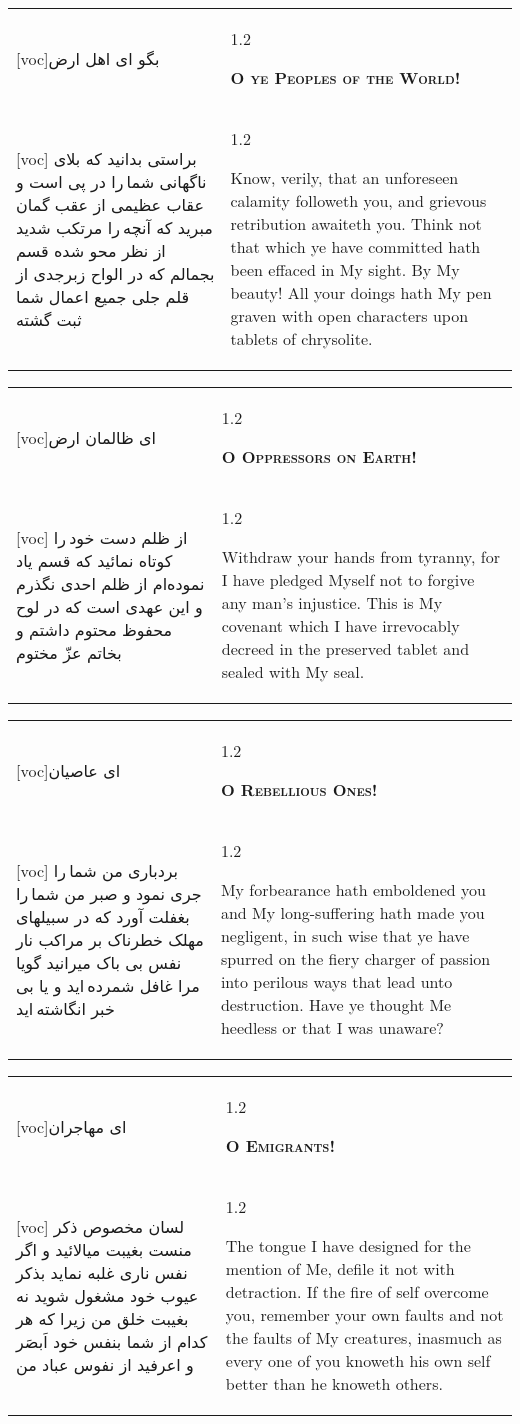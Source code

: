 \documentclass[11pt]{article}
\makeatletter
\newenvironment{orig}
  {\begin{farsi}[voc]}
  {\end{farsi}}
\newenvironment{trans}
  {\Large\begin{spacing}{1.2}\raggedright}
  {\end{spacing}}
\newenvironment{word}
  {\begin{tabular}[t]{p{2.75in}@{\hspace{3em}}p{2.75in}}}
  {\end{tabular}}
\newcommand{\ayat}[2]{\begin{orig}#1\end{orig} & \begin{trans}#2\end{trans}}
\newcommand{\heading}[2]{\textsc{\textbf{#1}} %
}
\makeatother
\begin{document}
\pagebreak

\begin{word}
\ayat{بگو ای اهل ارض}{\heading{O ye Peoples of the World!}{}} \\ \ayat{
براستی بدانيد که بلای ناگهانی شما را در پی است و عقاب عظيمی از عقب
گمان مبريد که آنچه را مرتکب شديد از نظر محو شده
قسم بجمالم که در الواح زبرجدی از قلم جلی جميع اعمال شما ثبت گشته
}{
  Know, verily, that an unforeseen calamity followeth you, and grievous
  retribution awaiteth you. Think not that which ye have committed hath been
  effaced in My sight. By My beauty! All your doings hath My pen graven with
  open characters upon tablets of chrysolite.
}
\end{word}

\pagebreak

\begin{word}
\ayat{ای ظالمان ارض}{\heading{O Oppressors on Earth!}{}} \\ \ayat{
از ظلم دست خود را کوتاه نمائيد که قسم ياد نموده‌ام از ظلم احدی نگذرم و اين عهدی است که در لوح محفوظ محتوم داشتم و بخاتم عزّ مختوم
}{
  Withdraw your hands from tyranny, for I have pledged Myself not to forgive
  any man's injustice. This is My covenant which I have irrevocably decreed in
  the preserved tablet and sealed with My seal.
}
\end{word}

\pagebreak

\begin{word}
\ayat{ای عاصيان}{\heading{O Rebellious Ones!}{}} \\ \ayat{
بردباری من شما را جری نمود و صبر من شما را بغفلت آورد که در سبيلهای مهلک خطرناک بر مراکب نار نفس بی باک ميرانيد گويا مرا غافل شمرده ايد و يا بی خبر انگاشته ايد
}{
  My forbearance hath emboldened you and My long-suffering hath made you
  negligent, in such wise that ye have spurred on the fiery charger of passion
  into perilous ways that lead unto destruction. Have ye thought Me heedless
  or that I was unaware?
}
\end{word}

\pagebreak

\begin{word}
\ayat{ای مهاجران}{\heading{O Emigrants!}{}} \\ \ayat{
لسان مخصوص ذکر منست بغيبت ميالائيد و اگر نفس ناری غلبه نمايد بذکر عيوب خود مشغول شويد نه بغيبت خلق من زيرا که هر کدام از شما بنفس خود اَبصَر و اعرفيد از نفوس عباد من
}{
  The tongue I have designed for the mention of Me, defile it not with
  detraction. If the fire of self overcome you, remember your own faults and
  not the faults of My creatures, inasmuch as every one of you knoweth his own
  self better than he knoweth others.
}
\end{word}
\end{document}
